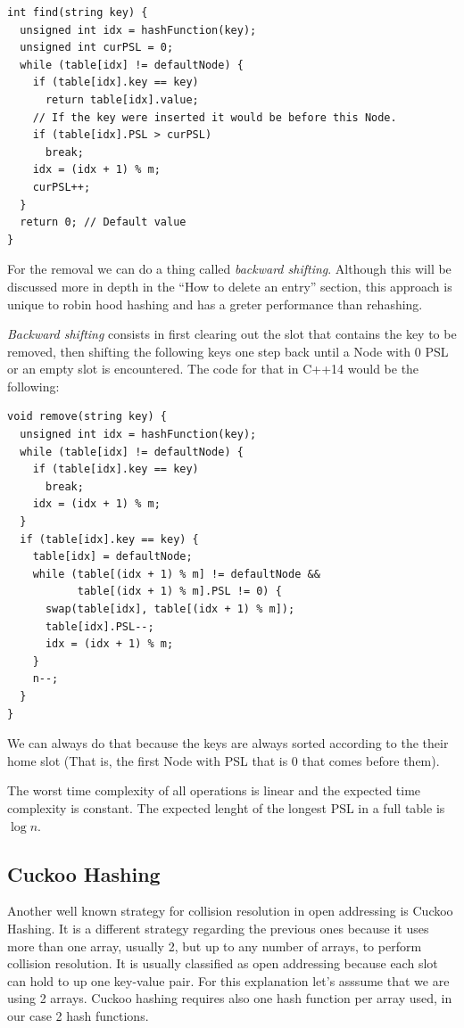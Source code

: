 \newpage

\begin{lstlisting}
int find(string key) {
  unsigned int idx = hashFunction(key);
  unsigned int curPSL = 0;
  while (table[idx] != defaultNode) {
    if (table[idx].key == key) 
      return table[idx].value;
    // If the key were inserted it would be before this Node.
    if (table[idx].PSL > curPSL)
      break; 
    idx = (idx + 1) % m;
    curPSL++;
  }
  return 0; // Default value
}
\end{lstlisting}

For the removal we can do a thing called \textit{backward shifting}. Although this will be discussed more in depth in the ``How to delete an entry'' section, this approach is unique to robin hood hashing and has a greter performance than rehashing.

\textit{Backward shifting} consists in first clearing out the slot that contains the key to be removed, then shifting the following keys one step back until a Node with 0 PSL or an empty slot is encountered. The code for that in C++14 would be the following:

\begin{lstlisting}
void remove(string key) {
  unsigned int idx = hashFunction(key);
  while (table[idx] != defaultNode) {
    if (table[idx].key == key) 
      break;
    idx = (idx + 1) % m;
  }
  if (table[idx].key == key) {
    table[idx] = defaultNode;
    while (table[(idx + 1) % m] != defaultNode &&
           table[(idx + 1) % m].PSL != 0) {
      swap(table[idx], table[(idx + 1) % m]);
      table[idx].PSL--;
      idx = (idx + 1) % m;
    }
    n--;
  }
}
\end{lstlisting}

We can always do that because the keys are always sorted according to the their home slot (That is, the first Node with PSL that is 0 that comes before them).

The worst time complexity of all operations is linear and the expected time complexity is constant. The expected lenght of the longest PSL in a full table is \( \log n \).

\subsection{Cuckoo Hashing}

Another well known strategy for collision resolution in open addressing is Cuckoo Hashing. It is a different strategy regarding the previous ones because it uses more than one array, usually 2, but up to any number of arrays, to perform collision resolution. It is usually classified as open addressing because each slot can hold to up one key-value pair. For this explanation let's asssume that we are using 2 arrays. Cuckoo hashing requires also one hash function per array used, in our case 2 hash functions.

